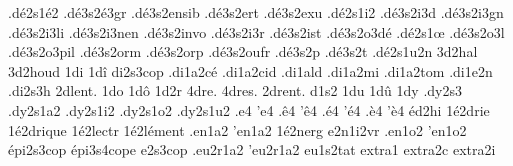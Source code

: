 {                    %
                    .dé2s1é2
                    .dé3s2é3gr
                    .dé3s2ensib
                    .dé3s2ert
                    .dé3s2exu
                    .dé2s1i2
                    .dé3s2i3d
                    .dé3s2i3gn
                    .dé3s2i3li
                    .dé3s2i3nen
                    .dé3s2invo
                    .dé3s2i3r
                    .dé3s2ist
                    .dé3s2o3dé
                    .dé2s1œ
                    .dé3s2o3l
                    .dé3s2o3pil
                    .dé3s2orm
                    .dé3s2orp
                    .dé3s2oufr
                    .dé3s2p %
                    .dé3s2t %
                    .dé2s1u2n
                    3d2hal
                    3d2houd
1di
1dî
                    di2s3cop
                    .di1a2cé
                    .di1a2cid
                    .di1ald
                    .di1a2mi
                    .di1a2tom
                    .di1e2n
                    .di2s3h
2dlent. %
1do
1dô
1d2r
4dre.
4dres.
2drent. %
d1s2
1du
1dû
1dy
                    .dy2s3
                    .dy2s1a2
                    .dy2s1i2
                    .dy2s1o2 %
                    .dy2s1u2
.e4
'e4
.ê4
'ê4
.é4
'é4
.è4
'è4
éd2hi %
                    1é2drie
                    1é2drique
                    1é2lectr
                    1é2lément
                    .en1a2
                    'en1a2
                    1é2nerg
                    e2n1i2vr
                    .en1o2
                    'en1o2
                    épi2s3cop
                    épi3s4cope
                    e2s3cop
                    .eu2r1a2
                    'eu2r1a2
                    eu1s2tat
                    extra1
                    extra2c
                    extra2i
}

